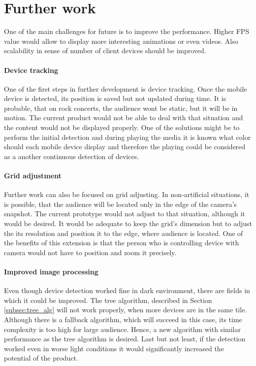 \section{Further work}
One of the main challenges for future is to improve the performance.
Higher FPS value would allow to display more interesting animations or even videos.
Also scalability in sense of number of client devices should be improved.

\paragraph{Device tracking}
One of the first steps in further development is device tracking.
Once the mobile device is detected, its position is saved but not updated during time.
It is probable, that on rock concerts, the audience wont be static, but it will be in motion.
The current product would not be able to deal with that situation and the content would not be displayed properly.
One of the solutions might be to perform the initial detection and during playing the media it is known what color should each mobile device display and therefore the playing could be considered as a another continuous detection of devices.

\paragraph{Grid adjustment}
Further work can also be focused on grid adjusting.
In non-artificial situations, it is possible, that the audience will be located only in the edge of the camera's snapshot.
The current prototype would not adjust to that situation, although it would be desired.
It would be adequate to keep the grid's dimension but to adjust the its resolution and position it to the edge, where audience is located.
One of the benefits of this extension is that the person who is controlling device with camera would not have to position and zoom it precisely.

\paragraph{Improved image processing}
Even though device detection worked fine in dark environment, there are fields in which it could be improved.
The tree algorithm, described in Section \ref{subsec:tree_alg} will not work properly, when more devices are in the same tile.
Although there is a fallback algorithm, which will succeed in this case, its time complexity is too high for large audience.
Hence, a new algorithm with similar performance as the tree algorithm is desired.
Last but not least, if the detection worked even in worse light conditions it would significantly increased the potential of the product.

